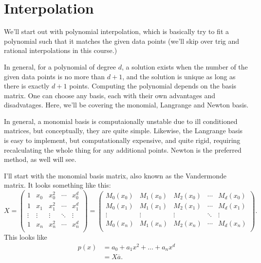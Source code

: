 \documentclass[5pt, a4paper]{article}
\begin{document}
\section{Interpolation}
We'll start out with polynomial interpolation, which is basically try to fit a
polynomial such that it matches the given data points (we'll skip over trig and
rational interpolations in this course.)

In general, for a polynomial of degree $d$, a solution exists when the number of
the given data points is no more than $d + 1$, and the solution is unique as
long as there is exactly $d+1$ points. Computing the polynomial depends on the
basis matrix. One can choose any basis, each with their own advantages and
disadvatages. Here, we'll be covering the monomial, Langrange and Newton basis.

In general, a monomial basis is computaionally unstable due to ill conditioned
matrices, but conceptually, they are quite simple. Likewise, the Langrange basis
is easy to implement, but computationally expensive, and quite rigid, requiring
recalculating the whole thing for any additional points. Newton is the preferred
method, as well will see.

I'll start with the monomial basis matrix, also known as the
Vandermonde matrix. It looks something like this: \[
X = \begin{pmatrix} 
    1 & x_0 & x_0^2 & \cdots & x_0^d \\
    1 & x_1 & x_1^2 & \cdots & x_1^d \\
    \vdots & \vdots & \vdots & \ddots & \vdots \\
    1 & x_n & x_n^2 & \cdots & x_n^d \\
\end{pmatrix} 
= \begin{pmatrix} 
    M_0(x_0) & M_1(x_0) & M_2(x_0) & \cdots & M_d(x_0) \\
    M_0(x_1) & M_1(x_1) & M_2(x_1) & \cdots & M_d(x_1) \\
    \vdots & \vdots & \vdots & \ddots & \vdots \\
    M_0(x_n) & M_1(x_n) & M_2(x_n) & \cdots & M_d(x_n) \\
\end{pmatrix} 
.\] 
This looks like 
\begin{align*}
    p(x) &= a_0 + a_1x^2+ \ldots + a_n x^d \\
    &=  X \overline{a}
.\end{align*}
\end{document}
